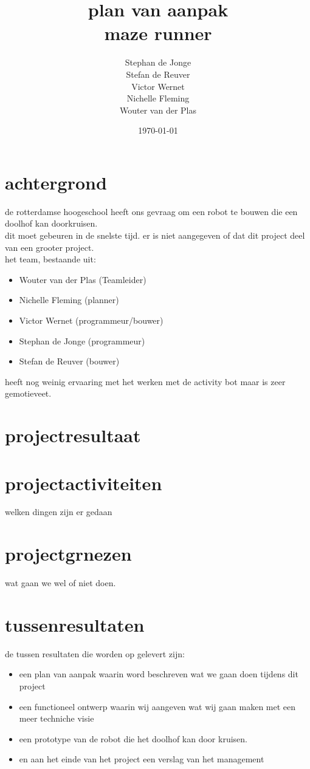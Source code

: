 \documentclass[oneside]{book}
\title{plan van aanpak\\maze runner}
\author{
	Stephan de Jonge\\
	Stefan de Reuver\\
	Victor Wernet\\
	Nichelle Fleming\\
	Wouter van der Plas
}
\date{\today}
\begin{document}
\maketitle
\tableofcontents
{}


\chapter{achtergrond}
de rotterdamse hoogeschool heeft ons gevraag om een robot te bouwen die een doolhof kan doorkruisen.\\
dit moet gebeuren in de snelste tijd. er is niet aangegeven of dat dit project deel van een grooter project.\\
het team, bestaande uit:\\
\begin{itemize}
	\item Wouter van der Plas (Teamleider)
	\item Nichelle Fleming (planner)
	\item Victor Wernet (programmeur/bouwer)
	\item Stephan de Jonge (programmeur)
	\item Stefan de Reuver (bouwer)
\end{itemize}	
heeft nog weinig ervaaring met het werken met de activity bot maar is zeer gemotieveet.\\


\clearpage
\chapter{projectresultaat}

\clearpage
\chapter{projectactiviteiten}
welken dingen zijn er gedaan
\clearpage
\chapter{projectgrnezen}
wat gaan we wel of niet doen.
\clearpage
\chapter{tussenresultaten}
	de tussen resultaten die worden op gelevert zijn:
\begin{itemize}
	\item een plan van aanpak waarin word beschreven wat we gaan doen tijdens dit project\\
	\item een functioneel ontwerp waarin wij aangeven wat wij gaan maken met een meer techniche visie\\
	\item een prototype van de robot die het doolhof kan door kruisen.\\
	\item en aan het einde van het project een verslag van het management
\end{itemize}
\clearpage
\end{document}
